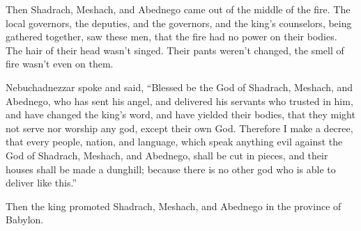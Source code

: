 {\par }{\PP Then Shadrach, Meshach, and Abednego came out of the middle of the fire.
The local governors, the deputies, and the governors, and the king’s counselors, being gathered together, saw these men, that the fire had no power on their bodies. The hair of their head wasn’t singed. Their pants weren’t changed, the smell of fire wasn’t even on them.
\par }{\PP {}Nebuchadnezzar spoke and said, “Blessed be the God of Shadrach, Meshach, and Abednego, who has sent his angel, and delivered his servants who trusted in him, and have changed the king’s word, and have yielded their bodies, that they might not serve nor worship any god, except their own God.
Therefore I make a decree, that every people, nation, and language, which speak anything evil against the God of Shadrach, Meshach, and Abednego, shall be cut in pieces, and their houses shall be made a dunghill; because there is no other god who is able to deliver like this.”
\par }{\PP {}Then the king promoted Shadrach, Meshach, and Abednego in the province of Babylon.

}
